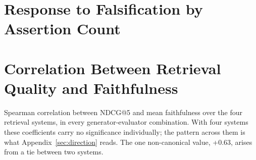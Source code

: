 \documentclass[11pt]{article}
\begin{document}
\section{Response to Falsification by Assertion Count}
\label{app:assertions}

\begin{table}[t]
\centering
\small
{}
\caption{Drop in score when one grounded value is falsified, by number of assertions in the answer, on Natural Questions. Under NLI-max the response decays as answers accumulate assertions; under claim-level aggregation it does not. The GPT-4o-mini rows beyond two assertions rest on 26, 10 and 7 cases and should be read as such. In the single-assertion row the two aggregates coincide exactly, which is the degenerate case they must reduce to.}
\label{tab:3}
\end{table}

\section{Correlation Between Retrieval Quality and Faithfulness}
\label{app:spearman}

Spearman correlation between NDCG@5 and mean faithfulness over the four retrieval systems, in every generator-evaluator combination. With four systems these coefficients carry no significance individually; the pattern across them is what Appendix~\ref{sec:direction} reads. The one non-canonical value, +0.63, arises from a tie between two systems.
\end{document}
